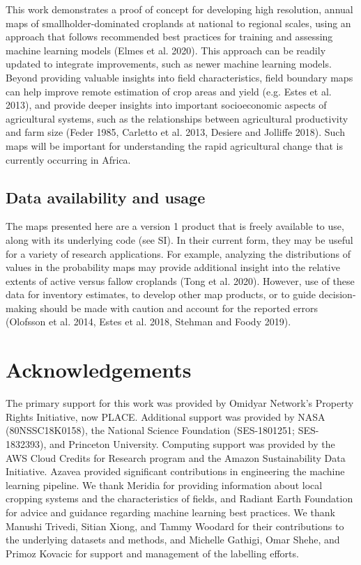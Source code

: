 \documentclass[11pt,a4paper]{article}
\begin{document}
This work demonstrates a proof of concept for developing high
resolution, annual maps of smallholder-dominated croplands at national
to regional scales, using an approach that follows recommended best
practices for training and assessing machine learning models (Elmes et
al. 2020). This approach can be readily updated to integrate
improvements, such as newer machine learning models. Beyond providing
valuable insights into field characteristics, field boundary maps can
help improve remote estimation of crop areas and yield (e.g. Estes et
al. 2013), and provide deeper insights into important socioeconomic
aspects of agricultural systems, such as the relationships between
agricultural productivity and farm size (Feder 1985, Carletto et al.
2013, Desiere and Jolliffe 2018). Such maps will be important for
understanding the rapid agricultural change that is currently occurring
in Africa.

\hypertarget{data-availability-and-usage}{%
\subsection{Data availability and
usage}\label{data-availability-and-usage}}

The maps presented here are a version 1 product that is freely available
to use, along with its underlying code (see SI). In their current form,
they may be useful for a variety of research applications. For example,
analyzing the distributions of values in the probability maps may
provide additional insight into the relative extents of active versus
fallow croplands (Tong et al. 2020). However, use of these data for
inventory estimates, to develop other map products, or to guide
decision-making should be made with caution and account for the reported
errors (Olofsson et al. 2014, Estes et al. 2018, Stehman and Foody
2019).

\hypertarget{acknowledgements}{%
\section{Acknowledgements}\label{acknowledgements}}

The primary support for this work was provided by Omidyar Network's
Property Rights Initiative, now PLACE. Additional support was provided
by NASA (80NSSC18K0158), the National Science Foundation (SES-1801251;
SES-1832393), and Princeton University. Computing support was provided
by the AWS Cloud Credits for Research program and the Amazon
Sustainability Data Initiative. Azavea provided significant
contributions in engineering the machine learning pipeline. We thank
Meridia for providing information about local cropping systems and the
characteristics of fields, and Radiant Earth Foundation for advice and
guidance regarding machine learning best practices. We thank Manushi
Trivedi, Sitian Xiong, and Tammy Woodard for their contributions to the
underlying datasets and methods, and Michelle Gathigi, Omar Shehe, and
Primoz Kovacic for support and management of the labelling efforts.
\end{document}
